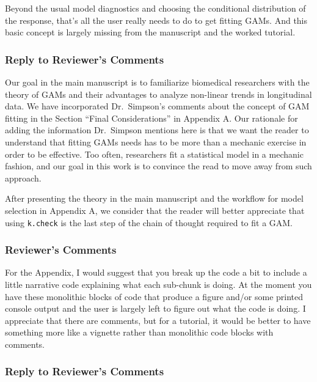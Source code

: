 \documentclass[
]{article}
\newcommand{\passthrough}[1]{#1}
\begin{document}
Beyond the usual model diagnostics and choosing the conditional distribution of the response, that's all the user really needs to do to get fitting GAMs. And this basic concept is largely missing from the manuscript and the worked tutorial.

\hypertarget{section-13}{%
\subsubsection{\texorpdfstring{\textcolor{reviewersblue} {Reply to Reviewer's Comments}}{}}\label{section-13}}

Our goal in the main manuscript is to familiarize biomedical researchers with the theory of GAMs and their advantages to analyze non-linear trends in longitudinal data. We have incorporated Dr.~Simpson's comments about the concept of GAM fitting in the Section ``Final Considerations'' in Appendix A. Our rationale for adding the information Dr.~Simpson mentions here is that we want the reader to understand that fitting GAMs needs has to be more than a mechanic exercise in order to be effective. Too often, researchers fit a statistical model in a mechanic fashion, and our goal in this work is to convince the read to move away from such approach.

After presenting the theory in the main manuscript and the workflow for model selection in Appendix A, we consider that the reader will better appreciate that using \passthrough{\lstinline!k.check!} is the last step of the chain of thought required to fit a GAM.

\hypertarget{reviewers-comments-13}{%
\subsubsection{Reviewer's Comments}\label{reviewers-comments-13}}

For the Appendix, I would suggest that you break up the code a bit to include a little narrative code explaining what each sub-chunk is doing. At the moment you have these monolithic blocks of code that produce a figure and/or some
printed console output and the user is largely left to figure out what the code is doing. I appreciate that there are comments, but for a tutorial, it would be better to have something more like a vignette rather than monolithic code
blocks with comments.

\hypertarget{section-14}{%
\subsubsection{\texorpdfstring{\textcolor{reviewersblue} {Reply to Reviewer's Comments}}{}}\label{section-14}}
\end{document}
